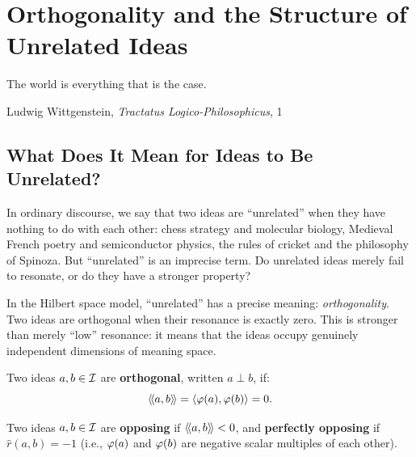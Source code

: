 \chapter{Orthogonality and the Structure of Unrelated Ideas}
\label{ch:orthogonality}

\epigraph{The world is everything that is the case.}{Ludwig Wittgenstein,
\textit{Tractatus Logico-Philosophicus}, 1}

\section{What Does It Mean for Ideas to Be Unrelated?}

In ordinary discourse, we say that two ideas are ``unrelated'' when they have
nothing to do with each other: chess strategy and molecular biology, Medieval
French poetry and semiconductor physics, the rules of cricket and the
philosophy of Spinoza. But ``unrelated'' is an imprecise term. Do unrelated
ideas merely fail to resonate, or do they have a stronger property?

In the Hilbert space model, ``unrelated'' has a precise meaning:
\emph{orthogonality}. Two ideas are orthogonal when their resonance is exactly
zero. This is stronger than merely ``low'' resonance: it means that the ideas
occupy genuinely independent dimensions of meaning space.

\begin{definition}
\label{def:orthogonal}
Two ideas $a, b \in \mathcal{I}$ are \textbf{orthogonal}, written $a \perp b$, if:
\[
  \langle\!\langle a, b \rangle\!\rangle = \langle \varphi(a), \varphi(b) \rangle = 0.
\]
\end{definition}

\begin{definition}
\label{def:opposing}
Two ideas $a, b \in \mathcal{I}$ are \textbf{opposing} if $\langle\!\langle a, b \rangle\!\rangle < 0$, and
\textbf{perfectly opposing} if $\hat{r}(a, b) = -1$ (i.e., $\varphi(a)$ and
$\varphi(b)$ are negative scalar multiples of each other).
\end{definition}

